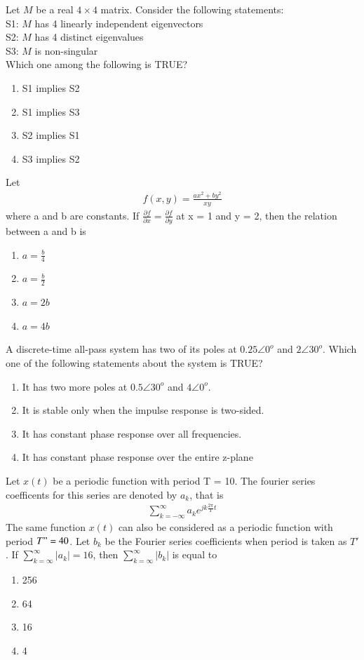 \item Let $M$ be a real $4 \times 4$ matrix. Consider the following statements:\\
S1: $M$ has 4 linearly independent eigenvectors\\
S2: $M$ has 4 distinct eigenvalues\\
S3: $M$ is non-singular\\
Which one among the following is TRUE?
\begin{enumerate}
\item S1 implies S2
\item S1 implies S3
\item S2 implies S1
\item S3 implies S2
\end{enumerate}

\item Let 
\begin{align*}
f(x, y) = \frac{ax^2 + by^2}{xy}
\end{align*}
where a and b are constants. If $\frac{\partial f}{\partial x} = \frac{\partial f}{\partial y}$ at x = 1 and y = 2, then the relation between a and b is
\begin{enumerate}
\item $a = \frac{b}{4}$
\item $a = \frac{b}{2}$
\item $a = 2b$
\item $a = 4b$
\end{enumerate}

\item A discrete-time all-pass system has two of its poles at $0.25\angle 0^{o}$ and $2\angle 30^{o}$. Which one of the following statements about the system is TRUE?
\begin{enumerate}
\item It has two more poles at $0.5 \angle 30^{o}$ and $4 \angle 0^{o}$.
\item It is stable only when the impulse response is two-sided.
\item It has constant phase response over all frequencies.
\item It has constant phase response over the entire z-plane
\end{enumerate}

\item Let $x(t)$ be a periodic function with period T = 10. The fourier series coefficents for this series are denoted by $a_k$, that is
\begin{align*}
\sum_{k = -\infty}^{\infty}a_ke^{jk\frac{2\pi}{T}t}
\end{align*}
The same function $x(t)$ can also be considered as a periodic function with period $T" = 40$. Let $b_k$ be the Fourier series coefficients when period is taken as $T'$. If $\sum_{k = \infty}^{\infty}|a_k| = 16$, then $\sum_{k = \infty}^{\infty}|b_k|$ is equal to
\begin{enumerate}
\item 256
\item 64
\item 16
\item 4
\end{enumerate}

